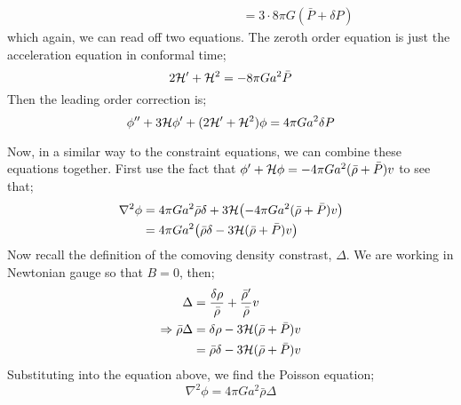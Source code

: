 \begin{itemize}
\begin{align*}
&\qquad \qquad \qquad \qquad \qquad= 3\cdot8\pi G(\bar{P} + \delta P)
\end{align*}
which again, we can read off two equations. The zeroth order equation is just the acceleration equation in conformal time;
\begin{equation*}
2\mathcal{H}^{\prime} + \mathcal{H}^2 = -8\pi Ga^2 \bar{P} \\
\end{equation*}
Then the leading order correction is;
\begin{equation*}
\phi^{\prime\prime} + 3\mathcal{H} \phi^{\prime} + (2\mathcal{H}^{\prime} + \mathcal{H}^2)\phi = 4\pi Ga^2 \delta P
\end{equation*}
\end{itemize}
Now, in a similar way to the constraint equations, we can combine these equations together. First use the fact that $\phi^{\prime} + \mathcal{H}\phi = -4\pi Ga^2 (\bar{\rho} + \bar{P})v$ to see that;
\begin{align*}
\nabla^2 \phi &= 4\pi Ga^2 \bar{\rho} \delta + 3\hamilt\left(-4\pi Ga^2 (\bar{\rho} + \bar{P})v\right) \\
&= 4\pi G a^2\left(\bar{\rho}\delta - 3\hamilt (\bar{\rho} + \bar{P})v\right)
\end{align*}
Now recall the definition of the comoving density constrast, $\Delta$. We are working in Newtonian gauge so that $B = 0$, then;
\begin{align*}
\Delta &= \frac{\delta \rho}{\bar{\rho}} + \frac{\bar{\rho}^{\prime}}{\bar{\rho}}v \\
\Rightarrow \bar{\rho}\Delta &= \delta \rho - 3\mathcal{H}(\bar{\rho} + \bar{P})v \\
&= \bar{\rho}\delta - 3\mathcal{H}(\bar{\rho} + \bar{P})v
\end{align*}
Substituting into the equation above, we find the Poisson equation;
\begin{equation*}
\nabla^2 \phi = 4\pi Ga^2 \bar{\rho} \Delta
\end{equation*}
